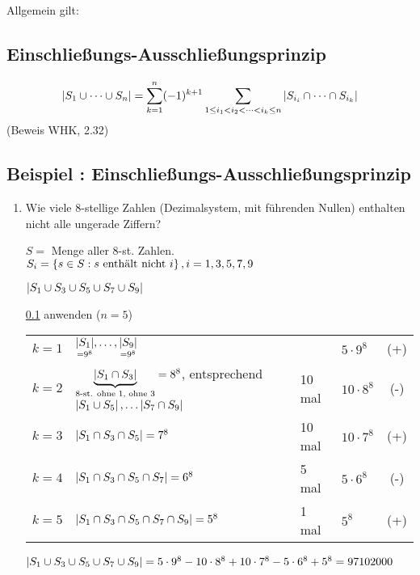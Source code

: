 Allgemein gilt:

\subsection{Einschließungs-Ausschließungsprinzip}
\label{subsec:einausschliessprinzip}

\[\abs{ S_1 \cup \dots \cup S_n} = \sum_{k=1}^n(-1)^{k+1} \sum_{1 \leq i_1 < i_2 < \dots < i_k \leq n}{\abs{S_{i_i} \cap \dots \cap S_{i_k}}} \]
(Beweis WHK, 2.32)

\subsection{Beispiel : Einschließungs-Ausschließungsprinzip}

\begin{enumerate}
	\item Wie viele 8-stellige Zahlen (Dezimalsystem, mit führenden Nullen) enthalten nicht alle ungerade Ziffern?
	
	$S =$ Menge aller 8-st. Zahlen.
	\\$S_i = \left\{s \in S : s \text{ enthält nicht } i\right\}, i = 1, 3, 5, 7, 9 $
	
	$\left|S_1 \cup S_3 \cup S_5 \cup S_7 \cup S_9\right|$
	
	\ref{subsec:einausschliessprinzip} anwenden 
	($n=5 $)
	
	\begin{tabular}{l@{ : }lllc}

	$k=1$ 
	& $\underset{=9^8}{\left|S_1\right|}, \dots, \underset{=9^8}{\left|S_9\right|}$
	&
	& $5 \cdot 9^8$ 
	& (+)\\
	
	
	$k=2$ 
	& $\underbrace{\left|S_1 \cap S_3\right|}_{\text{8-st. ohne 1, ohne 3}} = 8^8$, entsprechend $\left|S_1 \cup S_5\right|, \dots \left|S_7 \cap S_9\right|$ 
	& 10 mal 
	& $10 \cdot 8^8$ 
	&(-) \\
	
	$k=3$ 
	& $\left|S_1 \cap S_3 \cap S_5\right| = 7^8$ 
	& 10 mal 
	&$10 \cdot 7^8$ 
	&(+) \\
	
 	$k=4$
 	& $\left|S_1 \cap S_3 \cap S_5 \cap S_7\right| = 6^8$ 
 	& 5 mal 
 	& $5 \cdot 6^8$ 
 	& (-) \\
 	
 	$k=5$ 
 	& $\left|S_1 \cap S_3 \cap S_5 \cap S_7 \cap S_9\right| = 5^8$ 
 	& 1 mal 
 	& $5^8$ 
 	& (+) \\
	 \end{tabular}
 		
	
	$\left|S_1 \cup S_3 \cup S_5 \cup S_7 \cup S_9\right| = 5 \cdot 9^8 - 10 \cdot 8^8 + 10\cdot 7^8 - 5 \cdot 6^8 + 5^8 = 97102000$
\end{enumerate}
                             


















